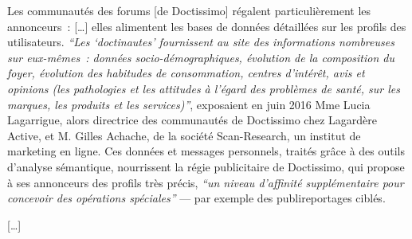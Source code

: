 \documentclass[11pt]{article}
\newcommand{\ellipse}{[…]\xspace}
\begin{document}
\begin{mdframed}[style=citationstyle]
Les communautés des forums [de Doctissimo] régalent particulièrement les annonceurs :
\ellipse
elles alimentent les bases de données détaillées sur les profils des utilisateurs. \emph{\enquote{Les \enquote{doctinautes} fournissent au site des informations nombreuses sur eux-mêmes : données socio-démographiques, évolution de la composition du foyer, évolution des habitudes de consommation, centres d'intérêt, avis et opinions (les pathologies et les attitudes à l'égard des problèmes de santé, sur les marques, les produits et les services)}}, exposaient en juin 2016 Mme Lucia Lagarrigue, alors directrice des communautés de Doctissimo chez Lagardère Active, et M. Gilles Achache, de la société Scan-Research, un institut de marketing en ligne. Ces données et messages personnels, traités grâce à des outils d'analyse sémantique, nourrissent la régie publicitaire de Doctissimo, qui propose à ses annonceurs des profils très précis, \emph{\enquote{un niveau d'affinité supplémentaire pour concevoir des opérations spéciales}} — par exemple des publireportages ciblés.

\ellipse




\end{mdframed}
\end{document}
